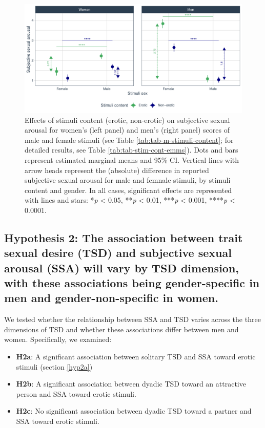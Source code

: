 \documentclass[
  bookmarksnumbered]{article}
\providecommand{\tightlist}{%
  \setlength{\itemsep}{0pt}\setlength{\parskip}{0pt}}
\begin{document}
\begin{figure}
\centering
\includegraphics{Sexual_Desire_Arousal_anonymous_files/figure-latex/fig-m-stimuli-content-1.pdf}
\caption{\label{fig:fig-m-stimuli-content}Effects of stimuli content (erotic, non-erotic) on subjective sexual arousal for women's (left panel) and men's (right panel) scores of male and female stimuli (see Table \ref{tab:tab-m-stimuli-content}; for detailed results, see Table \ref{tab:tab-stim-cont-emms}). Dots and bars represent estimated marginal means and 95\% CI. Vertical lines with arrow heads represent the (absolute) difference in reported subjective sexual arousal for male and femnale stimuli, by stimuli content and gender. In all cases, significant effects are represented with lines and stars: *\emph{p} \textless{} 0.05, **\emph{p} \textless{} 0.01, ***\emph{p} \textless{} 0.001, ****\emph{p} \textless{} 0.0001.}
\end{figure}

\subsection{Hypothesis 2: The association between trait sexual desire (TSD) and subjective sexual arousal (SSA) will vary by TSD dimension, with these associations being gender-specific in men and gender-non-specific in women.}\label{hyp2}

We tested whether the relationship between SSA and TSD varies across the three dimensions of TSD and whether these associations differ between men and women. Specifically, we examined:

\begin{itemize}
\tightlist
\item
  \textbf{H2a}: A significant association between solitary TSD and SSA toward erotic stimuli (section \ref{hyp2a})
\item
  \textbf{H2b}: A significant association between dyadic TSD toward an attractive person and SSA toward erotic stimuli.
\item
  \textbf{H2c}: No significant association between dyadic TSD toward a partner and SSA toward erotic stimuli.
\end{itemize}
\end{document}
